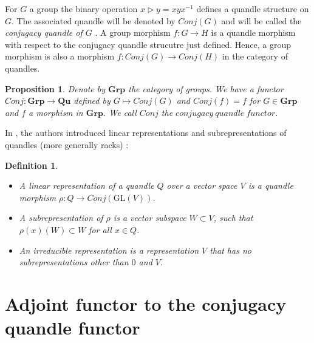 \documentclass[12pt, reqno]{amsart}
\newtheorem{proposition}[theorem]{Proposition}
\newtheorem{definition}[theorem]{Definition}
\newcommand{\Q}{{\mathbf{Qu}}}
\newcommand{\G}{{\mathbf{Grp}}}
\begin{document}
 For $G$ a group the binary operation $x\triangleright y= xyx^{-1}$ defines a quandle structure on $G$. The associated quandle will be denoted by $Conj(G)$ and will be called the \textit{conjugacy quandle of $G$} . A group morphism $f:G\to H$  is a quandle morphism with respect to the conjugacy quandle strucutre just defined. Hence, a group morphism is also a morphism $f: Conj(G)\to Conj(H)$ in the category of quandles. 
\begin{proposition}
Denote by $\G$ the category of groups. We have a functor $Conj: \G \to \Q$ defined by $G\mapsto Conj(G)$ and $Conj(f)=f$ for $G\in \G$ and $f$ a morphism in $\G$. We call $Conj$ the $\mathit{conjugacy\  quandle \ functor}$.
\end{proposition}
In \cite{rep}, the authors introduced linear representations and subrepresentations of quandles (more generally racks) :
\begin{definition}
\begin{itemize}
\item[1)] A linear representation of a quandle $Q$ over a vector space $V$ is a quandle morphism $\rho: Q \to Conj(\mathrm{GL}(V))$.
\item[2)] A subrepresentation of $\rho$ is a vector subspace $W\subset V$, such that $\rho(x)(W) \subset W$ for all $x\in Q$.
\item[3)] An irreducible representation is a representation $V$ that has no subrepresentations other than $0$ and $V$.
\end{itemize}
\end{definition}
\section{Adjoint functor to the conjugacy quandle functor}
\end{document}
